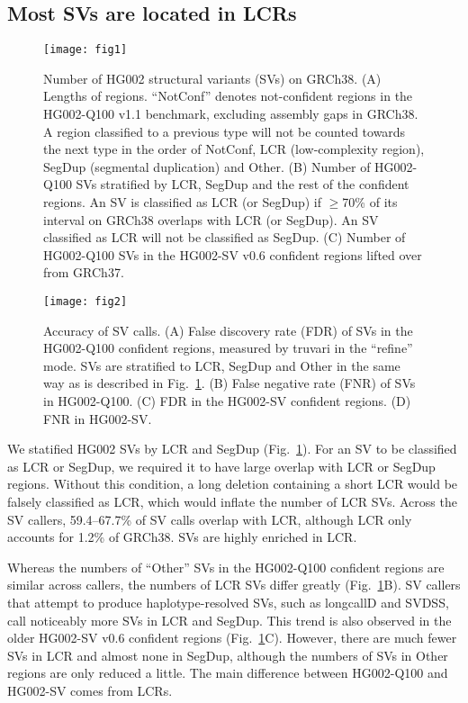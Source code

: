 \documentclass[a4paper,num-refs]{oup-contemporary}
\begin{document}
\subsection{Most SVs are located in LCRs}

\begin{figure}[tb]
\texttt{[image: fig1]}
\caption{Number of HG002 structural variants (SVs) on GRCh38.
(A) Lengths of regions.
``NotConf'' denotes not-confident regions in the HG002-Q100 v1.1 benchmark, excluding assembly gaps in GRCh38.
A region classified to a previous type will not be counted towards the next type
in the order of NotConf, LCR (low-complexity region), SegDup (segmental duplication) and Other.
(B) Number of HG002-Q100 SVs stratified by LCR, SegDup and the rest of the confident regions.
An SV is classified as LCR (or SegDup) if $\ge$70\% of its interval on GRCh38 overlaps with LCR (or SegDup).
An SV classified as LCR will not be classified as SegDup.
(C) Number of HG002-Q100 SVs in the HG002-SV v0.6 confident regions lifted over from GRCh37.}\label{fig:count}
\end{figure}

\begin{figure}[!tb]
\texttt{[image: fig2]}
\caption{Accuracy of SV calls.
(A) False discovery rate (FDR) of SVs in the HG002-Q100 confident regions, measured by truvari in the ``refine'' mode.
SVs are stratified to LCR, SegDup and Other in the same way as is described in Fig.~\ref{fig:count}.
(B) False negative rate (FNR) of SVs in HG002-Q100.
(C) FDR in the HG002-SV confident regions.
(D) FNR in HG002-SV.}\label{fig:acc}
\end{figure}

We statified HG002 SVs by LCR and SegDup (Fig.~\ref{fig:count}).
For an SV to be classified as LCR or SegDup, we required it to have large overlap with LCR or SegDup regions.
Without this condition, a long deletion containing a short LCR would be falsely classified as LCR, which would inflate the number of LCR SVs.
Across the SV callers, 59.4--67.7\% of SV calls overlap with LCR, although LCR only accounts for 1.2\% of GRCh38.
SVs are highly enriched in LCR.

Whereas the numbers of ``Other'' SVs in the HG002-Q100 confident regions are similar across callers,
the numbers of LCR SVs differ greatly (Fig.~\ref{fig:count}B).
SV callers that attempt to produce haplotype-resolved SVs, such as longcallD and SVDSS, call noticeably more SVs in LCR and SegDup.
This trend is also observed in the older HG002-SV v0.6 confident regions (Fig.~\ref{fig:count}C).
However, there are much fewer SVs in LCR and almost none in SegDup, although the numbers of SVs
in Other regions are only reduced a little.
The main difference between HG002-Q100 and HG002-SV comes from LCRs.
\end{document}
